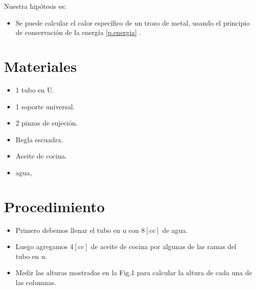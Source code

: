 \documentclass[a4paper, 12p]{article}
\begin{document}
Nuestra hipótesis es:
\begin{itemize}
      \item Se puede calcular el calor específico de un trozo de metal, usando el principio de conservación de la energía \eqref{p.energia} .
\end{itemize}


\section{Materiales}


\begin{itemize}
      \item 1 tubo en U.
      \item 1 soporte universal.
      \item 2 pinzas de sujeción.
      \item Regla escuadra.
      \item Aceite de cocina.
      \item agua,
\end{itemize}





\section{Procedimiento}

\begin{itemize}
      \item Primero debemos llenar el tubo en u con $8[cc]$ de agua.
      
      \item Luego agregamos $4[cc]$ de aceite de cocina por algunas de las ramas del tubo en u.
      
      \item Medir las alturas mostradas en la Fig.1 para calcular la altura de cada una de las columnas.
      
\end{itemize}
\end{document}
